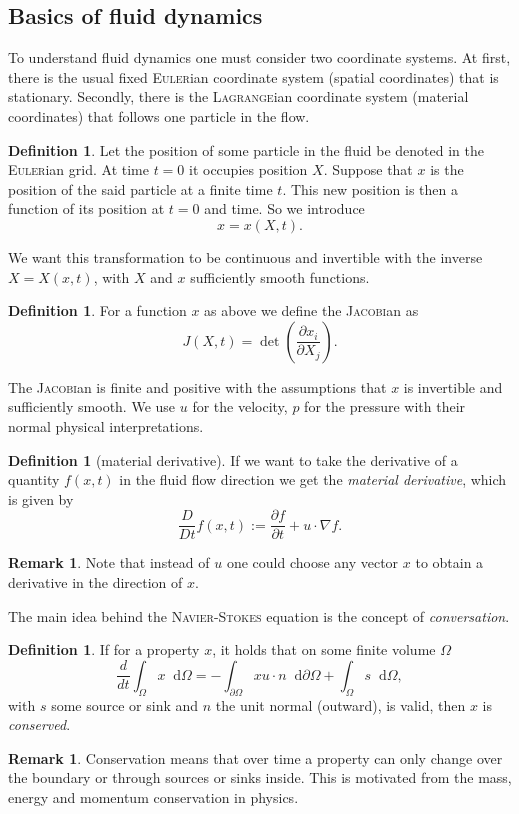 \documentclass[12pt,a4paper,twoside, open=right]{scrreprt}
\theoremstyle{definition}
\newtheorem{rem}[auf]{Remark}
\newtheorem{defn}[auf]{Definition}
\theoremstyle{plain}
\newcommand{\D}{\mathop{}\!\mathrm{d}}
\begin{document}
\subsection{Basics of fluid dynamics}
To understand fluid dynamics one must consider two coordinate systems. At first, there is the usual fixed \textsc{Euler}ian coordinate system (spatial coordinates) that is stationary. Secondly, there is the \textsc{Lagrange}ian coordinate system (material coordinates) that follows one particle in the flow. 
\begin{defn}
    Let the position of some particle in the fluid be denoted in the \textsc{Euler}ian grid. At time $t=0$ it occupies position $X$. Suppose that $x$ is the position of the said particle at a finite time $t$. This new position is then a function of its position at $t=0$ and time. So we introduce
    \begin{equation}
        x=x(X,t).
    \end{equation}
\end{defn}
We want this transformation to be continuous and invertible with the inverse $X=X(x,t)$, with $X$ and $x$ sufficiently smooth functions. 
\begin{defn}
    For a function $x$ as above we define the \textsc{Jacobi}an as
    \begin{equation}
        J(X,t)= \det\left(\frac{\partial x_i}{\partial X_j}\right).
    \end{equation}
\end{defn}
The \textsc{Jacobi}an is finite and positive with the assumptions that $x$ is invertible and sufficiently smooth. We use $u$ for the velocity, $p$ for the pressure with their normal physical interpretations.
\begin{defn}[material derivative]
    If we want to take the derivative of a quantity $f(x,t)$ in the fluid flow direction we get the \emph{material derivative}, which is given by 
    \begin{equation}
        \frac{D}{Dt}f(x,t):=\frac{\partial f}{\partial t} + u\cdot\nabla f.
    \end{equation}
\end{defn}
\begin{rem}
    Note that instead of $u$ one could choose any vector $x$ to obtain a derivative in the direction of $x$.
\end{rem}
The main idea behind the \textsc{Navier-Stokes} equation is the concept of \emph{conversation}. 
\begin{defn}
    If for a property $x$, it holds that on some finite volume $\Omega$
    \begin{equation}
        \frac{d}{dt}\int_\Omega x\D\Omega = -\int_{\partial\Omega}xu\cdot n\D\partial\Omega+\int_\Omega s\D\Omega,\label{eq:conservation}
    \end{equation}
   with $s$ some source or sink and $n$ the unit normal (outward), is valid, then $x$ is \emph{conserved}.
\end{defn}
\begin{rem}
    Conservation means that over time a property can only change over the boundary or through sources or sinks inside. This is motivated from the mass, energy and momentum conservation in physics.
\end{rem}
\end{document}
